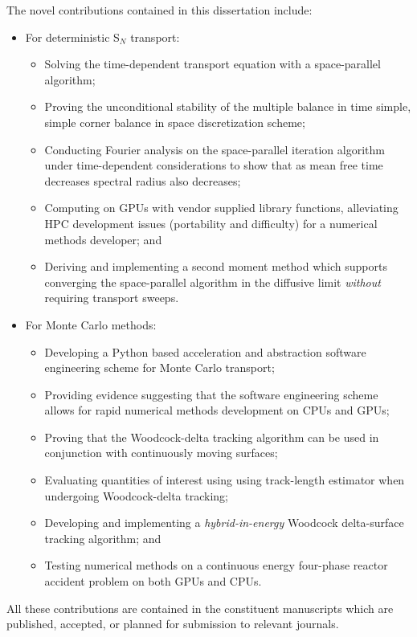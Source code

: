 The novel contributions contained in this dissertation include:
\begin{itemize}
    \item For deterministic S$_N$ transport:
    \begin{itemize}
        \item Solving the time-dependent transport equation with a space-parallel algorithm;
        \item Proving the unconditional stability of the multiple balance in time simple, simple corner balance in space discretization scheme;
        \item Conducting Fourier analysis on the space-parallel iteration algorithm under time-dependent considerations to show that as mean free time decreases spectral radius also decreases; 
        \item Computing on GPUs with vendor supplied library functions, alleviating HPC development issues (portability and difficulty) for a numerical methods developer; and
        \item Deriving and implementing a second moment method which supports converging the space-parallel algorithm in the diffusive limit \emph{without} requiring transport sweeps.
    \end{itemize}
    \item For Monte Carlo methods:
    \begin{itemize}
        \item Developing a Python based acceleration and abstraction software engineering scheme for Monte Carlo transport;
        \item Providing evidence suggesting that the software engineering scheme allows for rapid numerical methods development on CPUs and GPUs;
        \item Proving that the Woodcock-delta tracking algorithm can be used in conjunction with continuously moving surfaces;
        \item Evaluating quantities of interest using using track-length estimator when undergoing Woodcock-delta tracking;
        \item Developing and implementing a \emph{hybrid-in-energy} Woodcock delta-surface tracking algorithm; and
        \item Testing numerical methods on a continuous energy four-phase reactor accident problem on both GPUs and CPUs.
    \end{itemize}
\end{itemize}
All these contributions are contained in the constituent manuscripts which are published, accepted, or planned for submission to relevant journals.

